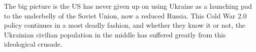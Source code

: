 The big picture is the US has never given up on using Ukraine as a launching
pad to the underbelly of the Soviet Union, now a reduced Russia. This Cold War
2.0 policy continues in a most deadly fashion, and whether they know it or not,
the Ukrainian civilian population in the middle has suffered greatly from this
ideological crusade.

\begin{multicols}{2}

\end{multicols}
